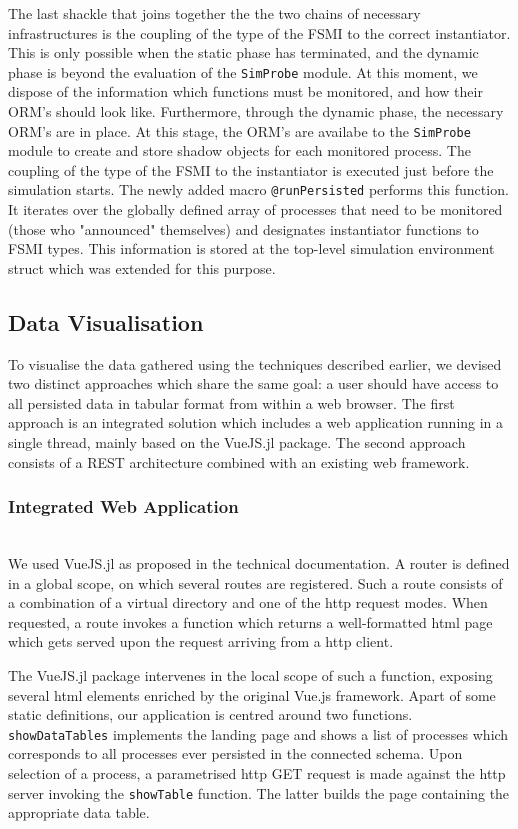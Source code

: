 \documentclass{juliacon}
\begin{document}
The last shackle that joins together the the two chains of necessary infrastructures is the coupling of the type of the FSMI to the correct instantiator. This is only possible when the static phase has terminated, and the dynamic phase is beyond the evaluation of the \texttt{SimProbe} module. At this moment, we dispose of the information which functions must be monitored, and how their ORM's should look like. Furthermore, through the dynamic phase, the necessary ORM's are in place. At this stage, the ORM's are availabe to the \texttt{SimProbe} module to create and store shadow objects for each monitored process. The coupling of the type of the FSMI to the instantiator is executed just before the simulation starts. The newly added macro \texttt{@runPersisted} performs this function. It iterates over the globally defined array of processes that need to be monitored (those who "announced" themselves) and designates instantiator functions to FSMI types. This information is stored at the top-level simulation environment struct which was extended for this purpose.\vskip 6pt

\subsection{Data Visualisation}
To visualise the data gathered using the techniques described earlier, we devised two distinct approaches which share the same goal: a user should have access to all persisted data in tabular format from within a web browser. The first approach is an integrated solution which includes a web application running in a single thread, mainly based on the VueJS.jl package. The second approach consists of a REST architecture combined with an existing web framework.\vskip 6pt

\subsubsection{Integrated Web Application}\hfill\\

We used VueJS.jl as proposed in the technical documentation. A router is defined in a global scope, on which several routes are registered. Such a route consists of a combination of a virtual directory and one of the http request modes. When requested, a route invokes a function which returns a well-formatted html page which gets served upon the request arriving from a http client.\vskip 6pt

The VueJS.jl package intervenes in the local scope of such a function, exposing several html elements enriched by the original Vue.js framework. Apart of some static definitions, our application is centred around two functions. \texttt{showDataTables} implements the landing page and shows a list of processes which corresponds to all processes ever persisted in the connected schema. Upon selection of a process, a parametrised http GET request is made against the http server invoking the \texttt{showTable} function. The latter builds the page containing the appropriate data table. \vskip 6pt
\end{document}
